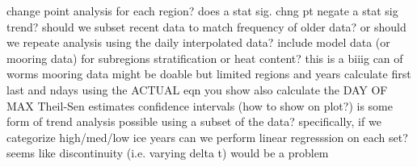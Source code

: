 \markdownRendererDocumentBegin
\markdownRendererUlBeginTight
\markdownRendererUlItem change point analysis for each region?\markdownRendererInterblockSeparator
{}\markdownRendererUlBeginTight
\markdownRendererUlItem does a stat sig. chng pt negate a stat sig trend?\markdownRendererUlItemEnd 
\markdownRendererUlEndTight \markdownRendererUlItemEnd 
\markdownRendererUlItem should we subset recent data to match frequency of older data? or should we repeate analysis using the daily interpolated data?\markdownRendererUlItemEnd 
\markdownRendererUlItem include model data (or mooring data) for subregions stratification or heat content? this is a biiig can of worms\markdownRendererUlItemEnd 
\markdownRendererUlItem mooring data might be doable but limited regions and years\markdownRendererUlItemEnd 
\markdownRendererUlItem calculate first last and ndays using the ACTUAL eqn you show\markdownRendererUlItemEnd 
\markdownRendererUlItem also calculate the DAY OF MAX\markdownRendererUlItemEnd 
\markdownRendererUlItem Theil-Sen estimates\markdownRendererUlItemEnd 
\markdownRendererUlItem confidence intervals (how to show on plot?)\markdownRendererUlItemEnd 
\markdownRendererUlItem is some form of trend analysis possible using a subset of the data?\markdownRendererInterblockSeparator
{}\markdownRendererUlBeginTight
\markdownRendererUlItem specifically, if we categorize high/med/low ice years can we perform linear regresssion on each set?\markdownRendererUlItemEnd 
\markdownRendererUlItem seems like discontinuity (i.e. varying delta t) would be a problem\markdownRendererUlItemEnd 
\markdownRendererUlEndTight \markdownRendererUlItemEnd 
\markdownRendererUlEndTight \markdownRendererDocumentEnd